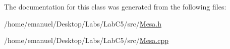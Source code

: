 The documentation for this class was generated from the following files\+:\begin{DoxyCompactItemize}
\item 
/home/emanuel/\+Desktop/\+Labs/\+Lab\+C5/src/\hyperlink{_mesa_8h}{Mesa.\+h}\item 
/home/emanuel/\+Desktop/\+Labs/\+Lab\+C5/src/\hyperlink{_mesa_8cpp}{Mesa.\+cpp}\end{DoxyCompactItemize}
